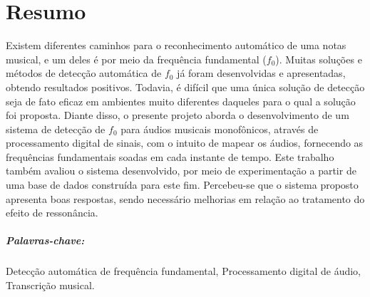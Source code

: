 \chapter*{Resumo}
\thispagestyle{empty}

Existem diferentes caminhos para o reconhecimento automático de uma notas musical, e um deles é por meio da frequência fundamental ($f_0$). Muitas soluções e métodos de detecção automática de $f_0$ já foram desenvolvidas e apresentadas, obtendo resultados positivos. Todavia, é difícil que uma única solução de detecção seja de fato eficaz em ambientes muito diferentes daqueles para o qual a solução foi proposta. Diante disso, o presente projeto aborda o desenvolvimento de um sistema de detecção de $f_0$ para áudios musicais monofônicos, através de processamento digital de sinais, com o intuito de mapear os áudios, fornecendo as frequências fundamentais soadas em cada instante de tempo. Este trabalho também avaliou o sistema desenvolvido, por meio de experimentação a partir de uma base de dados construída para este fim. Percebeu-se que o sistema proposto apresenta boas respostas, sendo necessário melhorias em relação ao tratamento do efeito de ressonância.

\vspace{50pt}

\paragraph{Palavras-chave:} Detecção automática de frequência fundamental, Processamento digital de áudio, Transcrição musical.
